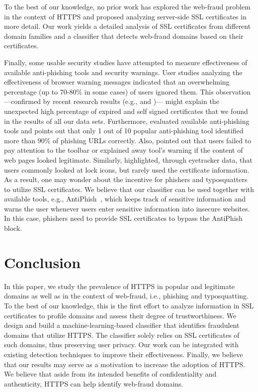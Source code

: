 \documentclass[twocolumn]{article}
\begin{document}
To the best of our knowledge, no prior work has explored the web-fraud problem 
in the context of HTTPS and proposed analyzing server-side SSL certificates in more detail.
Our work yields a detailed analysis of SSL certificates from different domain families and a 
classifier that detects web-fraud domains based on their certificates.

Finally, some usable security studies have attempted to measure effectiveness of available anti-phishing tools and security warnings.
User studies analyzing the effectiveness of browser warning messages indicated that an
overwhelming percentage (up to 70-80\% in some cases) of users ignored them. This
observation---confirmed by recent research results (e.g., \cite{ssl-usability}
and \cite{been-warned-ssl})--- might explain the unexpected high percentage of expired and
self signed certificates that we found in the results  of all our data sets.
Furthermore, \cite{zhang2007phinding} evaluated available anti-phishing tools and points out
that only 1 out of 10 popular anti-phishing tool identified more than $90\%$ of phishing URLs correctly.
Also, \cite{wu2006security} pointed out that users failed to pay attention to the toolbar or explained away
tool's warning if the content of web pages looked legitimate.
Similarly, \cite{whalen2005gathering} highlighted, through eyetracker data, that users commonly
looked at lock icons, but rarely used the certificate information. As a result, one may wonder about the incentive for phishers and typosquatters
to utilize SSL certificates. We believe that our classifier can be used together with available tools, e.g., AntiPhish~\cite{protectphish},
which keeps track of sensitive information and warns the user whenever users enter sensitive information into insecure websites. 
In this case, phishers need to provide SSL certificates to bypass the AntiPhish block.

\section{Conclusion}\label{sec:conclusion}
In this paper, we study the prevalence of HTTPS in popular and 
legitimate domains as well as in the 
context of web-fraud, i.e., phishing and typosquatting.
To the best of our knowledge, this is the first effort to analyze 
information in SSL certificates to profile domains and 
assess their degree of trustworthiness. We design and build a machine-learning-based 
classifier that identifies fraudulent domains that utilize HTTPS. The classifier solely relies on 
SSL certificates of such domains, thus preserving user privacy.
Our work can be integrated with existing detection techniques to 
improve their effectiveness.
Finally, we believe that our results may serve as a motivation
to increase the adoption of HTTPS. We believe that 
aside from its intended benefits of confidentiality and authenticity, 
HTTPS can help identify web-fraud domains.
\end{document}

